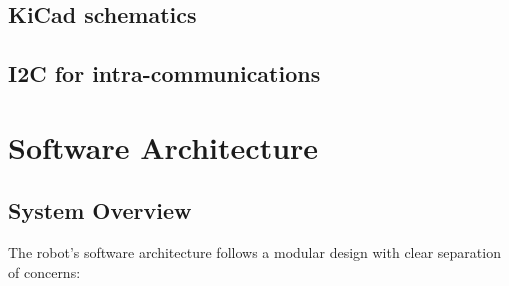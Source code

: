 \documentclass{article}
\begin{document}
\subsection{KiCad schematics}
\begin{figure}[H]
    \centering
\end{figure}


\subsection{I2C for intra-communications} %

\newpage
\section{Software Architecture}
\subsection{System Overview}
The robot's software architecture follows a modular design with clear separation of concerns:
\end{document}
